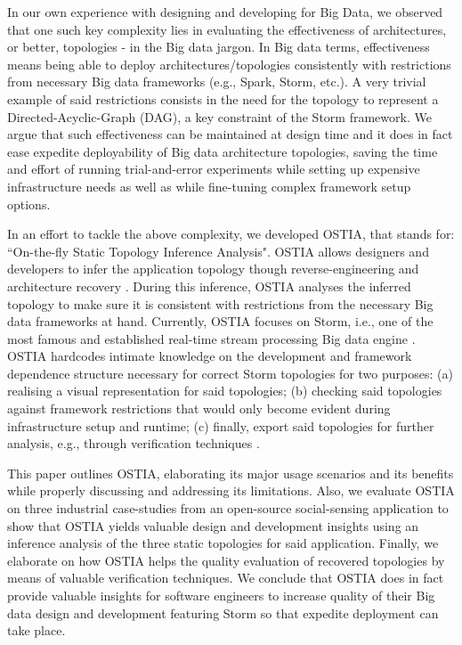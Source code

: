 In our own experience with designing and developing for Big Data, we observed that one such key complexity lies in evaluating the effectiveness of architectures, or better, topologies - in the Big data jargon. In Big data terms, effectiveness means being able to deploy architectures/topologies consistently with restrictions from necessary Big data frameworks (e.g., Spark, Storm, etc.). A very trivial example of said restrictions consists in the need for the topology to represent a Directed-Acyclic-Graph (DAG), a key constraint of the Storm framework.
We argue that such effectiveness can be maintained at design time and it does in fact ease expedite deployability of Big data architecture topologies, saving the time and effort of running trial-and-error experiments while setting up expensive infrastructure needs as well as while fine-tuning complex framework setup options.

In an effort to tackle the above complexity, we developed OSTIA, that stands for: ``On-the-fly Static Topology Inference Analysis". OSTIA allows designers and developers to infer the application topology though reverse-engineering and architecture recovery \cite{archrec}. During this inference, OSTIA analyses the inferred topology to make sure it is consistent with restrictions from the necessary Big data frameworks at hand. Currently, OSTIA focuses on Storm, i.e., one of the most famous and established real-time stream processing Big data engine \cite{storm}. OSTIA hardcodes intimate knowledge on the development and framework dependence structure necessary for correct Storm topologies for two purposes: (a) realising a visual representation for said topologies; (b) checking said topologies against framework restrictions that would only become evident during infrastructure setup and runtime; (c) finally, export said topologies for further analysis, e.g., through verification techniques \cite{marcello}.

This paper outlines OSTIA, elaborating its major usage scenarios and its benefits while properly discussing and addressing its limitations. Also, we evaluate OSTIA on three industrial case-studies from an open-source social-sensing application to show that OSTIA yields valuable design and development insights using an inference analysis of the three static topologies for said application. Finally, we elaborate on how OSTIA helps the quality evaluation of recovered topologies by means of valuable verification techniques. We conclude that OSTIA does in fact provide valuable insights for software engineers to increase quality of their Big data design and development featuring Storm so that expedite deployment can take place.

